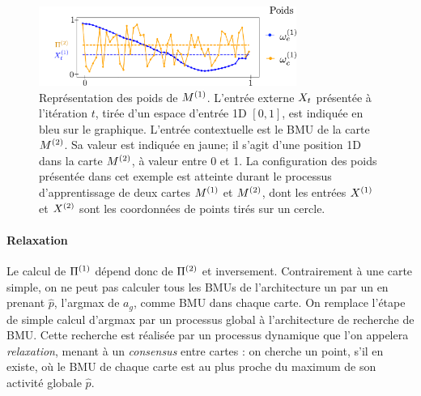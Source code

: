 \begin{figure}
\centering
\includegraphics[width=0.75\textwidth]{weights_2som.pdf}
\caption{Représentation des poids de $M^{({1})}$. L'entrée externe $X_t$ présentée à l'itération $t$, tirée d'un espace d'entrée 1D $[0,1]$, est indiquée en bleu sur le graphique. L'entrée contextuelle  est le BMU de la carte $M^{({2})}$. Sa valeur est indiquée en jaune; il s'agit d'une position 1D dans la carte $M^{({2})}$, à valeur entre 0 et 1. La configuration des poids présentée dans cet exemple est atteinte durant le processus d'apprentissage de deux cartes $M^{({1})}$ et $M^{({2})}$, dont les entrées $X^{({1})}$ et $X^{({2})}$ sont les coordonnées de points tirés sur un cercle. \label{fig:2som_weights}}
\end{figure}
\paragraph{Relaxation}
Le calcul de $\Pi^{({1})}$ dépend donc de $\Pi^{({2})}$ et inversement. Contrairement à une carte simple, on ne peut pas calculer tous les BMUs de l'architecture un par un en prenant $\hat{p}$, l'argmax de $a_g$, comme BMU dans chaque carte.
On remplace l'étape de simple calcul d'argmax par un processus global à l'architecture de recherche de BMU. Cette recherche est réalisée par un processus dynamique que l'on appelera \emph{relaxation}, menant à un \emph{consensus} entre cartes : on cherche un point, s'il en existe, où le BMU de chaque carte est au plus proche du maximum de son activité globale $\hat{p}$.

